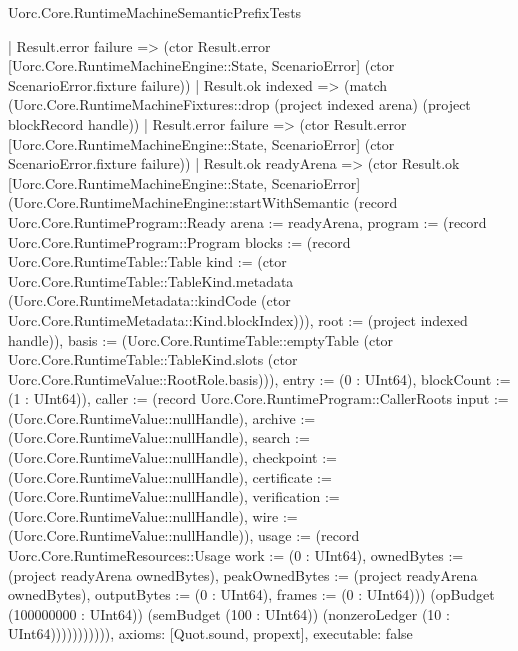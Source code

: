 \begin{lexlean}{Uorc.Core.RuntimeMachineSemanticPrefixTests}
\begin{semanticmodule}
{              | Result.error failure => (ctor Result.error [Uorc.Core.RuntimeMachineEngine::State, ScenarioError] (ctor ScenarioError.fixture failure))
              | Result.ok indexed => (match (Uorc.Core.RuntimeMachineFixtures::drop (project indexed arena) (project blockRecord handle))
                | Result.error failure => (ctor Result.error [Uorc.Core.RuntimeMachineEngine::State, ScenarioError] (ctor ScenarioError.fixture failure))
                | Result.ok readyArena => (ctor Result.ok [Uorc.Core.RuntimeMachineEngine::State, ScenarioError] (Uorc.Core.RuntimeMachineEngine::startWithSemantic (record Uorc.Core.RuntimeProgram::Ready {arena := readyArena, program := (record Uorc.Core.RuntimeProgram::Program {blocks := (record Uorc.Core.RuntimeTable::Table {kind := (ctor Uorc.Core.RuntimeTable::TableKind.metadata (Uorc.Core.RuntimeMetadata::kindCode (ctor Uorc.Core.RuntimeMetadata::Kind.blockIndex))), root := (project indexed handle)}), basis := (Uorc.Core.RuntimeTable::emptyTable (ctor Uorc.Core.RuntimeTable::TableKind.slots (ctor Uorc.Core.RuntimeValue::RootRole.basis))), entry := (0 : UInt64), blockCount := (1 : UInt64)}), caller := (record Uorc.Core.RuntimeProgram::CallerRoots {input := (Uorc.Core.RuntimeValue::nullHandle), archive := (Uorc.Core.RuntimeValue::nullHandle), search := (Uorc.Core.RuntimeValue::nullHandle), checkpoint := (Uorc.Core.RuntimeValue::nullHandle), certificate := (Uorc.Core.RuntimeValue::nullHandle), verification := (Uorc.Core.RuntimeValue::nullHandle), wire := (Uorc.Core.RuntimeValue::nullHandle)}), usage := (record Uorc.Core.RuntimeResources::Usage {work := (0 : UInt64), ownedBytes := (project readyArena ownedBytes), peakOwnedBytes := (project readyArena ownedBytes), outputBytes := (0 : UInt64), frames := (0 : UInt64)})}) (opBudget (100000000 : UInt64)) (semBudget (100 : UInt64)) (nonzeroLedger (10 : UInt64))))))))))),
  axioms: [Quot.sound, propext],
  executable: false
}


\end{semanticmodule}
\end{lexlean}
